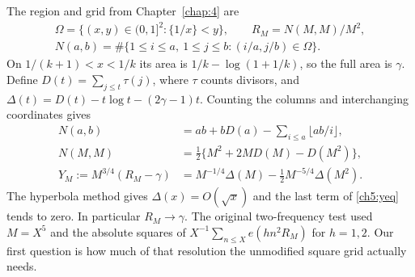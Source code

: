 \documentclass[11pt,a4paper,oneside,openany]{report}
\theoremstyle{remark}\newtheorem{remark}[theorem]{Remark}
\numberwithin{equation}{section}
\begin{document}
The region and grid from Chapter~\ref{chap:4} are
\[
 \begin{gathered}
 \Omega=\{(x,y)\in(0,1]^2:\{1/x\}<y\},\qquad R_M=N(M,M)/M^2,\\
 N(a,b)=\#\{1\le i\le a,\ 1\le j\le b:(i/a,j/b)\in\Omega\}.
 \end{gathered}
\]
On $1/(k+1)<x<1/k$ its area is $1/k-\log(1+1/k)$, so the full area is $\gamma$. Define $D(t)=\sum_{j\le t}\tau(j)$, where $\tau$ counts divisors, and $\Delta(t)=D(t)-t\log t-(2\gamma-1)t$. Counting the columns and interchanging coordinates gives
\begin{align}
 N(a,b)&=ab+bD(a)-\sum_{i\le a}\lfloor ab/i\rfloor,\label{ch5:neq}\\
 N(M,M)&=\tfrac12\{M^2+2MD(M)-D(M^2)\},\nonumber\\
 Y_M:=M^{3/4}(R_M-\gamma)&=M^{-1/4}\Delta(M)-\tfrac12M^{-5/4}\Delta(M^2).\label{ch5:yeq}
\end{align}
The hyperbola method gives $\Delta(x)=O(\sqrt x)$ and the last term of \eqref{ch5:yeq} tends to zero. In particular $R_M\to\gamma$. The original two-frequency test used $M=X^5$ and the absolute squares of $X^{-1}\sum_{n\le X}e(hn^2R_M)$ for $h=1,2$. Our first question is how much of that resolution the unmodified square grid actually needs.
\end{document}
